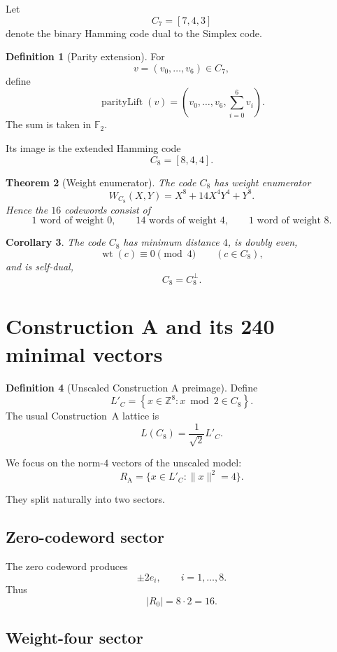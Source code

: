 \documentclass[11pt,a4paper]{article}
\newtheorem{theorem}{Theorem}[section]
\newtheorem{corollary}[theorem]{Corollary}
\theoremstyle{definition}
\newtheorem{definition}[theorem]{Definition}
\theoremstyle{remark}
\newcommand{\F}{\mathbb F}
\newcommand{\Z}{\mathbb Z}
\newcommand{\RA}{R_{\mathrm A}}
\newcommand{\wt}{\operatorname{wt}}
\begin{document}
Let
\[
C_7=[7,4,3]
\]
denote the binary Hamming code dual to the Simplex code.

\begin{definition}[Parity extension]
For
\[
v=(v_0,\ldots,v_6)\in C_7,
\]
define
\[
\operatorname{parityLift}(v)
=
\left(
v_0,\ldots,v_6,
\sum_{i=0}^{6}v_i
\right).
\]
The sum is taken in $\F_2$.
\end{definition}

Its image is the extended Hamming code
\[
C_8=[8,4,4].
\]

\begin{theorem}[Weight enumerator]
The code $C_8$ has weight enumerator
\[
W_{C_8}(X,Y)
=
X^8+14X^4Y^4+Y^8.
\]
Hence the $16$ codewords consist of
\[
1\text{ word of weight }0,\qquad
14\text{ words of weight }4,\qquad
1\text{ word of weight }8.
\]
\end{theorem}

\begin{corollary}
The code $C_8$ has minimum distance $4$, is doubly even,
\[
\wt(c)\equiv0\pmod4
\qquad(c\in C_8),
\]
and is self-dual,
\[
C_8=C_8^\perp.
\]
\end{corollary}

\section{Construction A and its 240 minimal vectors}

\begin{definition}[Unscaled Construction A preimage]
Define
\[
L'_C
=
\left\{
x\in\Z^8:
x\bmod2\in C_8
\right\}.
\]
The usual Construction~A lattice is
\[
L(C_8)
=
\frac1{\sqrt2}L'_C.
\]
\end{definition}

We focus on the norm-$4$ vectors of the unscaled model:
\[
\RA
=
\{x\in L'_C:\|x\|^2=4\}.
\]

They split naturally into two sectors.

\subsection{Zero-codeword sector}

The zero codeword produces
\[
\pm2e_i,
\qquad i=1,\ldots,8.
\]
Thus
\[
|R_0|=8\cdot2=16.
\]

\subsection{Weight-four sector}
\end{document}
